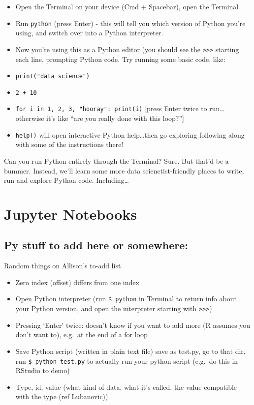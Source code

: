 \documentclass[
]{book}
\providecommand{\tightlist}{%
  \setlength{\itemsep}{0pt}\setlength{\parskip}{0pt}}
\begin{document}
\begin{itemize}
\item
  Open the Terminal on your device (Cmd + Spacebar), open the Terminal
\item
  Run \texttt{python} (press Enter) - this will tell you which version of Python you're using, and switch over into a Python interpreter.
\item
  Now you're using this as a Python editor (you should see the \texttt{\textgreater{}\textgreater{}\textgreater{}} starting each line, prompting Python code. Try running some basic code, like:
\item
  \texttt{print("data\ science")}
\item
  \texttt{2\ +\ 10}
\item
  \texttt{for\ i\ in\ 1,\ 2,\ 3,\ "hooray":\ print(i)} {[}press Enter twice to run\ldots otherwise it's like ``are you really done with this loop?''{]}
\item
  \texttt{help()} will open interactive Python help\ldots then go exploring following along with some of the instructions there!
\end{itemize}

Can you run Python entirely through the Terminal? Sure. But that'd be a bummer. Instead, we'll learn some more data scienctist-friendly places to write, run and explore Python code. Including\ldots{}

\hypertarget{jupyter-notebooks}{%
\section{Jupyter Notebooks}\label{jupyter-notebooks}}

\hypertarget{py-stuff-to-add-here-or-somewhere}{%
\subsection{Py stuff to add here or somewhere:}\label{py-stuff-to-add-here-or-somewhere}}

Random things on Allison's to-add list

\begin{itemize}
\tightlist
\item
  Zero index (offset) differs from one index
\item
  Open Python interpreter (run \texttt{\$\ python} in Terminal to return info about your Python version, and open the interpreter starting with \texttt{\textgreater{}\textgreater{}\textgreater{}})
\item
  Pressing `Enter' twice: doesn't know if you want to add more (R assumes you don't want to), e.g.~at the end of a for loop
\item
  Save Python script (written in plain text file) save as test.py, go to that dir, run \texttt{\$\ python\ test.py} to actually run your python script (e.g.~do this in RStudio to demo)
\item
  Type, id, value (what kind of data, what it's called, the value compatible with the type (ref Lubanovic))
\end{itemize}
\end{document}
